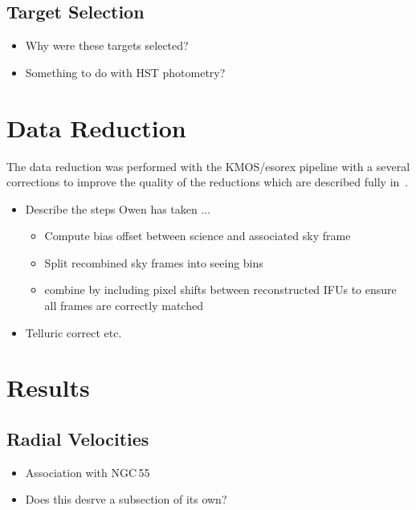 \subsection{Target Selection} %
\label{sub:target_selection}

\begin{itemize}
    \item Why were these targets selected?
    \item Something to do with HST photometry?
\end{itemize}


\section{Data Reduction} %
\label{sec:data_reduction}

The data reduction was performed with the KMOS/esorex pipeline with a several corrections to improve the quality of the reductions which are described fully in~\cite{Turner-prep}.



\begin{itemize}
    \item Describe the steps Owen has taken ...
    \begin{itemize}
        \item Compute bias offset between science and associated sky frame
        \item Split recombined sky frames into seeing bins
        \item combine by including pixel shifts between reconstructed IFUs to ensure all frames are correctly matched
    \end{itemize}
    \item Telluric correct etc.
\end{itemize}
\section{Results} %
\label{sec:results}

\subsection{Radial Velocities} %
\label{sub:radial_velocities}
\begin{itemize}
\item Association with NGC\,55
    \item Does this desrve a subsection of its own?
\end{itemize}
